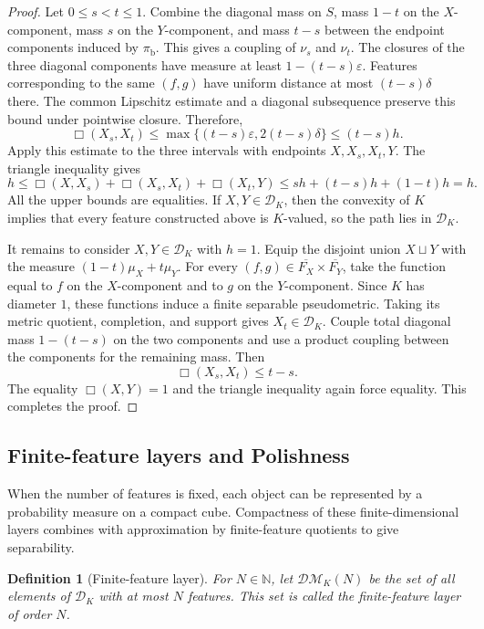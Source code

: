 \documentclass[10pt,a4paper]{amsart}
\newtheorem{definition}[theorem]{Definition}
\newcommand{\DK}{\mathcal D_K}
\newcommand{\DM}{\mathcal{DM}}
\begin{document}
\begin{proof}
Let $0\leq s<t\leq1$. Combine the diagonal mass on $S$, mass $1-t$ on the $X$-component, mass $s$ on the $Y$-component, and mass $t-s$ between the endpoint components induced by $\pi_{\mathrm b}$. This gives a coupling of $\nu_s$ and $\nu_t$. The closures of the three diagonal components have measure at least $1-(t-s)\varepsilon$. Features corresponding to the same $(f,g)$ have uniform distance at most $(t-s)\delta$ there. The common Lipschitz estimate and a diagonal subsequence preserve this bound under pointwise closure. Therefore,
\[
\Box(X_s,X_t)
\leq\max\{(t-s)\varepsilon,2(t-s)\delta\}
\leq(t-s)h.
\]
Apply this estimate to the three intervals with endpoints $X,X_s,X_t,Y$. The triangle inequality gives
\[
h\leq\Box(X,X_s)+\Box(X_s,X_t)+\Box(X_t,Y)
\leq sh+(t-s)h+(1-t)h=h.
\]
All the upper bounds are equalities. If $X,Y\in\DK$, then the convexity of $K$ implies that every feature constructed above is $K$-valued, so the path lies in $\DK$.

It remains to consider $X,Y\in\DK$ with $h=1$. Equip the disjoint union $X\sqcup Y$ with the measure $(1-t)\mu_X+t\mu_Y$. For every $(f,g)\in\overline{F_X}\times\overline{F_Y}$, take the function equal to $f$ on the $X$-component and to $g$ on the $Y$-component. Since $K$ has diameter $1$, these functions induce a finite separable pseudometric. Taking its metric quotient, completion, and support gives $X_t\in\DK$. Couple total diagonal mass $1-(t-s)$ on the two components and use a product coupling between the components for the remaining mass. Then
\[
\Box(X_s,X_t)\leq t-s.
\]
The equality $\Box(X,Y)=1$ and the triangle inequality again force equality. This completes the proof.
\end{proof}

\subsection{Finite-feature layers and Polishness}
\label{subsec:screened-polish}

When the number of features is fixed, each object can be represented by a probability measure on a compact cube. Compactness of these finite-dimensional layers combines with approximation by finite-feature quotients to give separability.

\begin{definition}[Finite-feature layer]
\label{def:bounded-measurements}
For $N\in\mathbb N$, let $\DM_K(N)$ be the set of all elements of $\DK$ with at most $N$ features. This set is called the \emph{finite-feature layer} of order $N$.
\end{definition}
\end{document}
